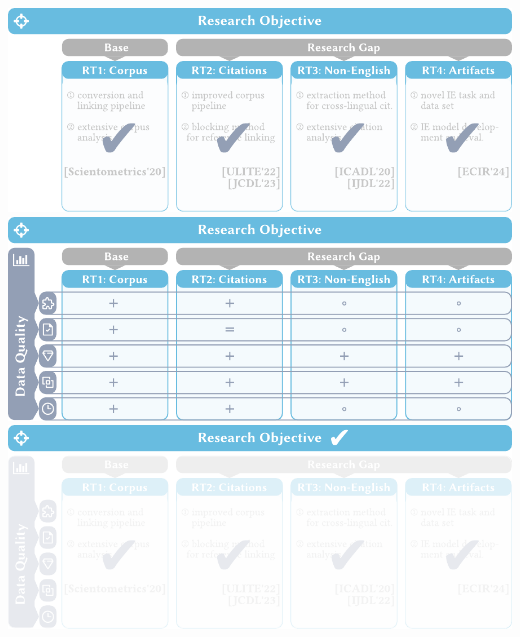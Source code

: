 \documentclass[en,16:9,smallfoot]{sdqbeamer}
\begin{document}
\begin{frame}[plain]
\begin{overprint}
            \centering\includegraphics[width=\textwidth]{imgs/objective_grid_and_contrib_conclusion_rts_3}
            \centering\includegraphics[width=\textwidth]{imgs/objective_grid_and_contrib_conclusion_dq}
            \centering\includegraphics[width=\textwidth]{imgs/objective_grid_and_contrib_conclusion_ro}
       \end{overprint}
   \end{frame}
\end{document}
